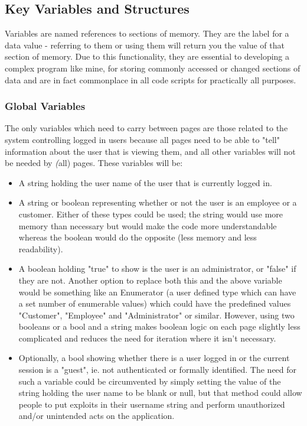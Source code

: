 ﻿\documentclass{article}
\begin{document}
    \subsection{Key Variables and Structures}
    Variables are named references to sections of memory.
    They are the label for a data value - referring to them or using them will return you the value of that section of memory.
    Due to this functionality, they are essential to developing a complex program like mine, for storing commonly accessed or changed sections of data and are in fact commonplace in all code scripts for practically all purposes.
    \subsubsection{Global Variables}
    The only variables which need to carry between pages are those related to the system controlling logged in users because all pages need to be able to "tell" information about the user that is viewing them, and all other variables will not be needed by \textit(all) pages.
    These variables will be:
    \begin{itemize}
        \item A string holding the user name of the user that is currently logged in.
        \item A string or boolean representing whether or not the user is an employee or a customer.
        Either of these types could be used; the string would use more memory than necessary but would make the code more understandable whereas the boolean would do the opposite (less memory and less readability).
        \item A boolean holding "true" to show is the user is an administrator, or "false" if they are not.
        Another option to replace both this and the above variable would be something like an Enumerator (a user defined type which can have a set number of enumerable values) which could have the predefined values "Customer", "Employee" and "Administrator" or similar.
        However, using two booleans or a bool and a string makes boolean logic on each page slightly less complicated and reduces the need for iteration where it isn't necessary.
        \item Optionally, a bool showing whether there is a user logged in or the current session is a "guest", ie. not authenticated or formally identified.
        The need for such a variable could be circumvented by simply setting the value of the string holding the user name to be blank or null, but that method could allow people to put exploits in their username string and perform unauthorized and/or unintended acts on the application.
    \end{itemize}
\end{document}

